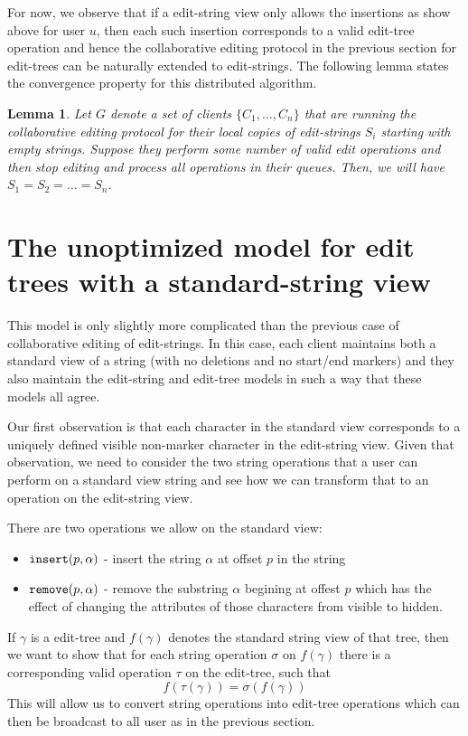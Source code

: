 \documentclass{amsart}
\newtheorem{lemma}[theorem]{Lemma}
\begin{document}
For now, we observe that if a edit-string view only allows the insertions
as show above for user $u$, then each such insertion corresponds to a valid
edit-tree operation and hence the collaborative editing protocol in the previous
section for edit-trees can be naturally extended to edit-strings. The following
lemma states the convergence property for this distributed algorithm.


\begin{lemma}
Let $G$ denote a set of clients $\{C_1,\ldots,C_n\}$
that are running the collaborative
editing protocol for their local copies of edit-strings $S_i$
starting with empty strings.
Suppose they perform some number of valid
edit operations and then stop editing and process all operations in their queues.
Then, 
we will have $S_1=S_2=\ldots=S_n$.
\end{lemma}


\newpage
\section{The unoptimized model for edit trees with a standard-string view}

This model is only slightly more complicated than the previous case of
collaborative editing of edit-strings.  In this case, each client maintains
both a standard view of a string (with no deletions and no start/end markers)
and they also maintain the edit-string and edit-tree models in such a way
that these models all agree.

Our first observation is that each character in the standard view corresponds
to a uniquely defined visible non-marker character in the edit-string view. 
Given that observation,
we need to consider the two string operations that a user can perform on a
standard view string and see how we can transform that to an operation on 
the edit-string view.

There are two operations we allow on the standard view:
\begin{itemize}
\item ${\tt insert}(p,\alpha)$ - insert the string $\alpha$ at offset $p$ in the string
\item ${\tt remove}(p,\alpha)$ - remove the substring $\alpha$ begining at offest $p$
which has the effect of changing the attributes of those characters from visible to hidden.
\end{itemize}

If $\gamma$ is a edit-tree and $f(\gamma)$ denotes the standard string view
of that tree, then we want to show that for each string operation $\sigma$
on $f(\gamma)$ there is a corresponding valid operation $\tau$
on the edit-tree, such that 
\[
f(\tau(\gamma)) = \sigma(f(\gamma))
\]
This will allow us to convert string operations into edit-tree operations which
can then be broadcast to all user as in the previous section. 
\end{document}
